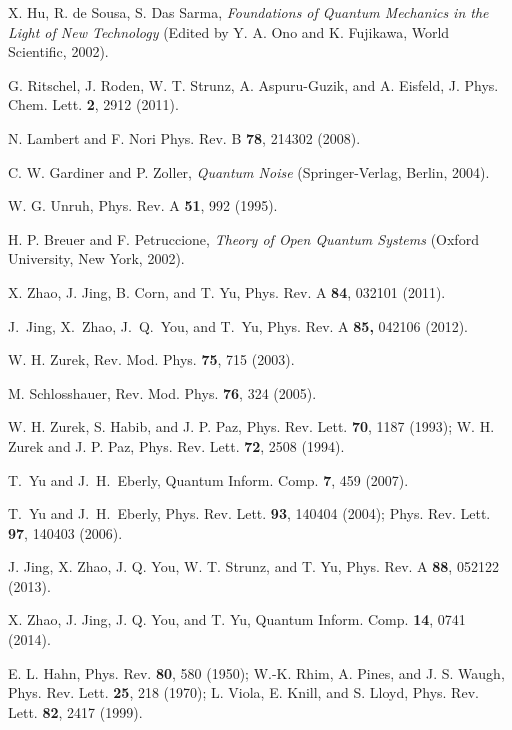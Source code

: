 \documentclass[preprint]{elsarticle}
\begin{document}
\begin{thebibliography}{10}



X.  Hu, R. de Sousa, S. Das Sarma, {\it  Foundations of Quantum Mechanics in the Light of New Technology}
(Edited by  Y. A. Ono and K. Fujikawa, World Scientific, 2002).


   G. Ritschel, J.  Roden, W.  T. Strunz,  A. Aspuru-Guzik, and A.  Eisfeld,    J. Phys. Chem. Lett. {\bf 2}, 2912 (2011).

  N. Lambert and F.  Nori
Phys. Rev. B {\bf 78}, 214302 (2008).

C. W. Gardiner and P. Zoller, \emph{Quantum Noise}
(Springer-Verlag, Berlin, 2004).

 W. G. Unruh, Phys. Rev. A {\bf 51}, 992 (1995).

H. P. Breuer and F. Petruccione, \emph{Theory of
Open Quantum Systems} (Oxford University, New York, 2002).

X. Zhao, J. Jing, B. Corn, and T. Yu, Phys. Rev.
A \textbf{84}, 032101 (2011).

J.~Jing, X.~Zhao, J.~Q.~You, and T.~Yu, Phys.
Rev. A \textbf{85,} 042106 (2012).


W. H. Zurek, Rev. Mod. Phys. \textbf{75}, 715 (2003).

M. Schlosshauer, Rev. Mod. Phys. \textbf{76}, 324
(2005).

W. H. Zurek, S. Habib, and J. P. Paz, Phys. Rev. Lett.
\textbf{70}, 1187 (1993); W. H. Zurek and J. P. Paz, Phys. Rev. Lett.
\textbf{72}, 2508 (1994).

 T.~Yu and J.~H.~Eberly,  Quantum
Inform. Comp. \textbf{7}, 459 (2007).


T.~Yu and J.~H.~Eberly, Phys. Rev. Lett.
\textbf{93}, 140404 (2004); Phys. Rev. Lett. \textbf{97}, 140403
(2006).


J. Jing, X. Zhao, J. Q. You, W. T. Strunz,
and T. Yu, Phys. Rev. A \textbf{88}, 052122 (2013).

X. Zhao, J. Jing, J. Q. You, and T. Yu, Quantum
Inform. Comp. \textbf{14}, 0741 (2014).

E. L. Hahn, Phys. Rev. \textbf{80}, 580 (1950); W.-K.
Rhim, A. Pines, and J. S. Waugh, Phys. Rev. Lett. \textbf{25}, 218
(1970); L. Viola, E. Knill, and S. Lloyd, Phys. Rev. Lett. \textbf{82},
2417 (1999).


\end{thebibliography}
\end{document}
